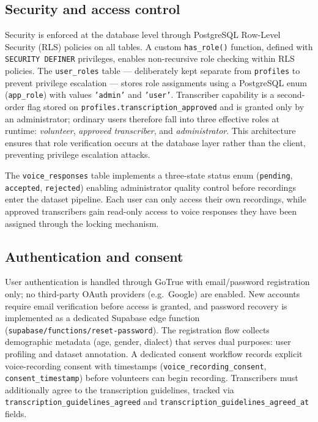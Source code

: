 \documentclass[final,5p,times,twocolumn]{elsarticle}
\begin{document}
\subsection{Security and access control}
Security is enforced at the database level through PostgreSQL Row-Level Security (RLS) policies on all tables. A custom \texttt{has\_role()} function, defined with \texttt{SECURITY DEFINER} privileges, enables non-recursive role checking within RLS policies. The \texttt{user\_roles} table --- deliberately kept separate from \texttt{profiles} to prevent privilege escalation --- stores role assignments using a PostgreSQL enum (\texttt{app\_role}) with values \texttt{'admin'} and \texttt{'user'}. Transcriber capability is a second-order flag stored on \texttt{profiles.transcription\_approved} and is granted only by an administrator; ordinary users therefore fall into three effective roles at runtime: \emph{volunteer}, \emph{approved transcriber}, and \emph{administrator}. This architecture ensures that role verification occurs at the database layer rather than the client, preventing privilege escalation attacks.

The \texttt{voice\_responses} table implements a three-state status enum (\texttt{pending}, \texttt{accepted}, \texttt{rejected}) enabling administrator quality control before recordings enter the dataset pipeline. Each user can only access their own recordings, while approved transcribers gain read-only access to voice responses they have been assigned through the locking mechanism.

\subsection{Authentication and consent}
User authentication is handled through GoTrue with email/password registration only; no third-party OAuth providers (e.g.\ Google) are enabled. New accounts require email verification before access is granted, and password recovery is implemented as a dedicated Supabase edge function (\texttt{supabase/functions/reset-password}). The registration flow collects demographic metadata (age, gender, dialect) that serves dual purposes: user profiling and dataset annotation. A dedicated consent workflow records explicit voice-recording consent with timestamps (\texttt{voice\_recording\_consent}, \texttt{consent\_timestamp}) before volunteers can begin recording. Transcribers must additionally agree to the transcription guidelines, tracked via \texttt{transcription\_guidelines\_agreed} and \texttt{transcription\_guidelines\_agreed\_at} fields.
\end{document}
